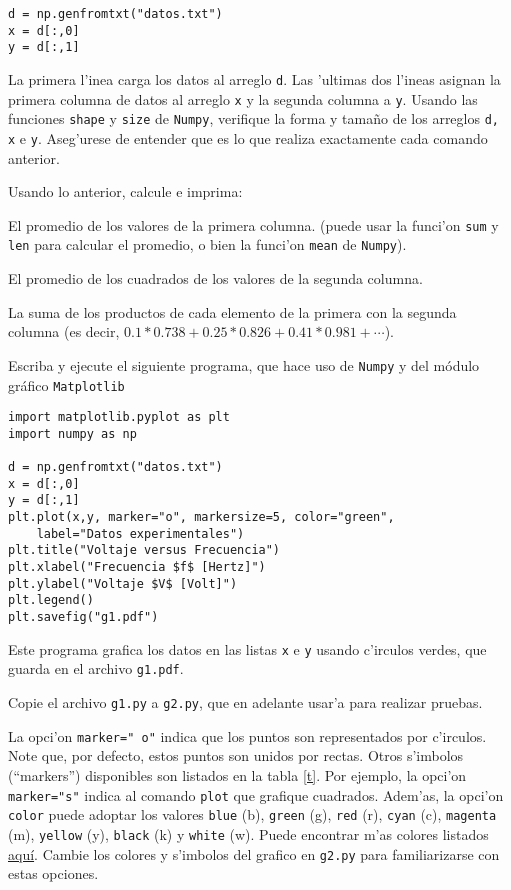 \documentclass[11pt]{exam}
\begin{document}
\begin{questions}
\begin{verbatim}
d = np.genfromtxt("datos.txt")
x = d[:,0]
y = d[:,1]
\end{verbatim}

La primera l'inea carga los datos al arreglo \texttt{d}. Las 'ultimas dos l'ineas asignan la primera columna de datos al arreglo \texttt{x} y la segunda columna a \texttt{y}. Usando las funciones \texttt{shape} y \texttt{size} de \texttt{Numpy}, verifique la forma y tama\~no de los arreglos \texttt{d, x} e \texttt{y}. Aseg'urese de entender que es lo que realiza exactamente cada comando anterior.

\item Usando lo anterior, calcule e imprima:
\begin{parts}
\item El promedio de los valores de la primera columna. (puede usar la funci'on \texttt{sum} y \texttt{len} para calcular el promedio, o bien la funci'on \texttt{mean} de \texttt{Numpy}).
\item El promedio de los cuadrados de los valores de la segunda columna.
\item La suma de los productos de cada elemento de la primera con la segunda columna (es decir, $0.1*0.738 + 0.25 *	0.826 + 0.41 * 0.981 +\cdots$).
\end{parts}

\item Escriba y ejecute el siguiente programa, que hace uso de \texttt{Numpy} y del módulo gráfico \texttt{Matplotlib}

\begin{verbatim}
import matplotlib.pyplot as plt
import numpy as np

d = np.genfromtxt("datos.txt")
x = d[:,0]
y = d[:,1]
plt.plot(x,y, marker="o", markersize=5, color="green", 
	label="Datos experimentales")
plt.title("Voltaje versus Frecuencia")
plt.xlabel("Frecuencia $f$ [Hertz]")
plt.ylabel("Voltaje $V$ [Volt]")
plt.legend()
plt.savefig("g1.pdf")
\end{verbatim}

Este programa grafica los datos en las listas \texttt{x} e \texttt{y} usando c'irculos verdes, que guarda en el archivo \texttt{g1.pdf}.
\item Copie el archivo \texttt{g1.py} a \texttt{g2.py}, que en adelante usar'a para realizar pruebas. 
\item La opci'on \texttt{marker="\,o"} indica que los puntos son representados por c'irculos. Note que, por defecto, estos puntos son unidos por rectas. Otros s'imbolos (``markers'') disponibles son listados en la tabla \ref{t}. Por ejemplo, la opci'on \texttt{marker="s"} indica al comando \texttt{plot} que grafique cuadrados. 
Adem'as, la opci'on \texttt{color} puede adoptar los valores \texttt{blue} (b), \texttt{green} (g), \texttt{red} (r), \texttt{cyan} (c), \texttt{magenta} (m), \texttt{yellow} (y), \texttt{black} (k) y \texttt{white} (w). Puede encontrar m'as colores listados \href{http://matplotlib.org/examples/color/named_colors.html}{aqu\'i}. Cambie los colores y s'imbolos del grafico en \texttt{g2.py} para familiarizarse con estas opciones.


\end{questions}
\end{document}
